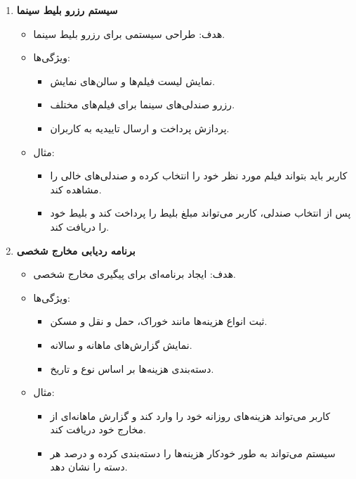 \documentclass[a4paper,12pt]{article}
\begin{document}
\begin{enumerate}
			\item \textbf{سیستم رزرو بلیط سینما}
			\begin{itemize}
				\item هدف: طراحی سیستمی برای رزرو بلیط سینما.
				\item ویژگی‌ها:
				\begin{itemize}
					\item نمایش لیست فیلم‌ها و سالن‌های نمایش.
					\item رزرو صندلی‌های سینما برای فیلم‌های مختلف.
					\item پردازش پرداخت و ارسال تاییدیه به کاربران.
				\end{itemize}
				\item مثال:
				\begin{itemize}
					\item کاربر باید بتواند فیلم مورد نظر خود را انتخاب کرده و صندلی‌های خالی را مشاهده کند.
					\item پس از انتخاب صندلی، کاربر می‌تواند مبلغ بلیط را پرداخت کند و بلیط خود را دریافت کند.
				\end{itemize}
			\end{itemize}
			
			\item \textbf{برنامه ردیابی مخارج شخصی}
			\begin{itemize}
				\item هدف: ایجاد برنامه‌ای برای پیگیری مخارج شخصی.
				\item ویژگی‌ها:
				\begin{itemize}
					\item ثبت انواع هزینه‌ها مانند خوراک، حمل و نقل و مسکن.
					\item نمایش گزارش‌های ماهانه و سالانه.
					\item دسته‌بندی هزینه‌ها بر اساس نوع و تاریخ.
				\end{itemize}
				\item مثال:
				\begin{itemize}
					\item کاربر می‌تواند هزینه‌های روزانه خود را وارد کند و گزارش ماهانه‌ای از مخارج خود دریافت کند.
					\item سیستم می‌تواند به طور خودکار هزینه‌ها را دسته‌بندی کرده و درصد هر دسته را نشان دهد.
				\end{itemize}
			\end{itemize}
			

\end{enumerate}
\end{document}
